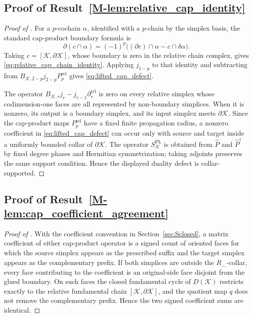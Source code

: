 \documentclass[11pt]{article}
\numberwithin{equation}{section}
\theoremstyle{definition}
\theoremstyle{remark}
\newcommand{\K}{\mathcal{K}}
\newcommand{\bd}{\partial}
\begin{document}
\subsection{Proof of Result~\ref{M-lem:relative_cap_identity}}\label{app:proof:lem:relative_cap_identity}
\begin{proof}[Proof of ]
For a \(p\)-cochain \(\alpha\), identified with a \(p\)-chain by the simplex basis, the standard
cap-product boundary formula \cite[Section~3.3]{Hatcher} is
\[
\partial(c\cap\alpha)=(-1)^p\bigl((\partial c)\cap\alpha-c\cap\delta\alpha\bigr).
\]
Taking \(c=[\K,\bd\K]\), whose boundary is zero in the relative chain complex, gives
\eqref{eq:relative_cap_chain_identity}. Applying \(j_{1-p}\) to that identity and subtracting
from \(B_{\K,2-p}j_{2-p}P^{\mathrm{rel}}_p\) gives \eqref{eq:lifted_cap_defect}.

The operator \(B_{\K,r}j_r-j_{r-1}\partial^{\mathrm{rel}}_r\) is zero on every relative simplex
whose codimension-one faces are all represented by non-boundary simplices. When it is nonzero, its
output is a boundary simplex, and its input simplex meets \(\bd\K\). Since the cap-product maps
\(P^{\mathrm{rel}}_p\) have a fixed finite propagation radius, a nonzero coefficient in
\eqref{eq:lifted_cap_defect} can occur only with source and target inside a uniformly bounded
collar of \(\bd\K\). The operator \(S^{\mathrm{PL}}_\K\) is obtained from \(\widehat P\) and
\(\widehat P^\dagger\) by fixed degree phases and Hermitian symmetrization; taking adjoints
preserves the same support condition. Hence the displayed duality defect is collar-supported.
\end{proof}

\subsection{Proof of Result~\ref{M-lem:cap_coefficient_agreement}}\label{app:proof:lem:cap_coefficient_agreement}
\begin{proof}[Proof of ]
With the coefficient convention in Section~\ref{sec:Sclosed}, a matrix coefficient of either
cap-product operator is a signed count of oriented faces for which the source simplex appears as
the prescribed suffix and the target simplex appears as the complementary prefix. If both simplices
are outside the \(R_\frown\)-collar, every face contributing to the coefficient is an original-side
face disjoint from the glued boundary. On such faces the closed fundamental cycle of \(D(\K)\)
restricts exactly to the relative fundamental chain \([\K,\bd\K]\), and the quotient map \(q\)
does not remove the complementary prefix. Hence the two signed coefficient sums are identical.
\end{proof}
\end{document}
